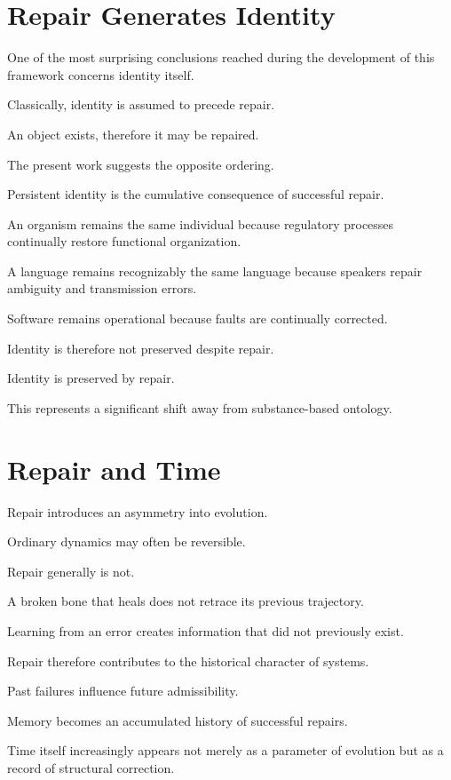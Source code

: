 \documentclass[11pt,oneside]{book}
\numberwithin{equation}{chapter}
\theoremstyle{definition}
\theoremstyle{plain}
\begin{document}
\section{Repair Generates Identity}

One of the most surprising conclusions reached during the development of
this framework concerns identity itself.

Classically, identity is assumed to precede repair.

An object exists, therefore it may be repaired.

The present work suggests the opposite ordering.

Persistent identity is the cumulative consequence of successful repair.

An organism remains the same individual because regulatory processes
continually restore functional organization.

A language remains recognizably the same language because speakers repair
ambiguity and transmission errors.

Software remains operational because faults are continually corrected.

Identity is therefore not preserved despite repair.

Identity is preserved by repair.

This represents a significant shift away from substance-based ontology.

\section{Repair and Time}

Repair introduces an asymmetry into evolution.

Ordinary dynamics may often be reversible.

Repair generally is not.

A broken bone that heals does not retrace its previous trajectory.

Learning from an error creates information that did not previously exist.

Repair therefore contributes to the historical character of systems.

Past failures influence future admissibility.

Memory becomes an accumulated history of successful repairs.

Time itself increasingly appears not merely as a parameter of evolution but
as a record of structural correction.
\end{document}
